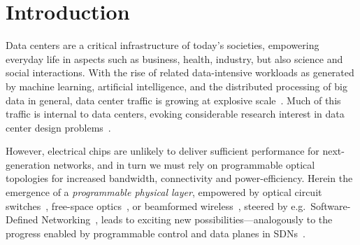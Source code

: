 \documentclass[sigconf]{acmart}
\begin{document}



\maketitle

\section{Introduction}\label{sec:intro}
%
Data centers are a critical infrastructure of today's societies, empowering everyday life in aspects such as business, health, industry, but also science and social interactions.
%
With the rise of related data-intensive workloads as generated by machine learning, artificial intelligence, and the distributed processing of big data in general, data center traffic is growing at explosive scale~\cite{DBLP:journals/cacm/SinghOAAABBDFGK16,networking2016cisco}.
%
Much of this traffic is internal to data centers, evoking considerable research interest in data center design problems~\cite{DBLP:journals/comsur/XiaZWX17,DBLP:journals/comsur/Noormohammadpour18}.
%

%
However, electrical chips are unlikely to deliver sufficient performance for next-generation networks, and in turn we must rely on programmable optical topologies for increased bandwidth, connectivity and power-efficiency.
%
Herein the emergence of a \emph{programmable physical layer}, empowered by optical circuit switches~\cite{helios,cthrough,DBLP:journals/comsur/KachrisT12}, free-space optics~\cite{projector,Hamedazimi2014}, or beamformed wireless~\cite{augmenting,DBLP:journals/comsur/HamzaDA16}, steered by e.g.\ Software-Defined Networking~\cite{alsmadi2017systematic}, leads to exciting new possibilities---analogously to the progress enabled by programmable control and data planes in SDNs~\cite{DBLP:conf/hpsr/BifulcoR18,DBLP:journals/pieee/KreutzRVRAU15,DBLP:journals/ccr/FeamsterRZ14}. 
 
\end{document}
